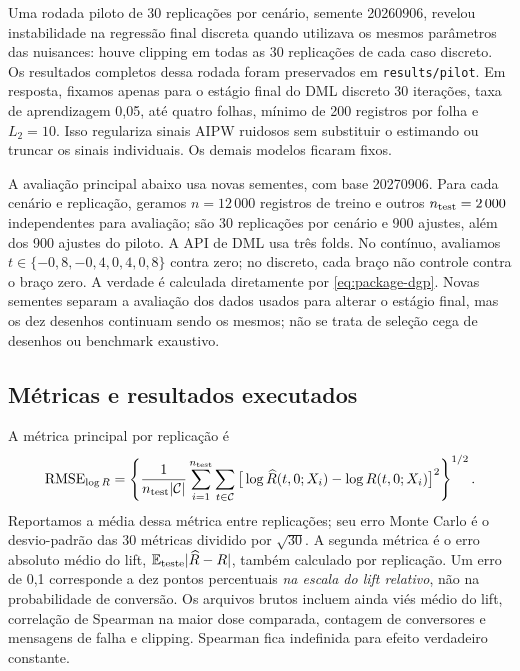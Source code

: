 Uma rodada piloto de 30 replicações por cenário, semente 20260906, revelou instabilidade na regressão final discreta quando utilizava os mesmos parâmetros das nuisances: houve clipping em todas as 30 replicações de cada caso discreto. Os resultados completos dessa rodada foram preservados em \texttt{results/pilot}. Em resposta, fixamos apenas para o estágio final do DML discreto 30 iterações, taxa de aprendizagem 0,05, até quatro folhas, mínimo de 200 registros por folha e $L_2=10$. Isso regulariza sinais AIPW ruidosos sem substituir o estimando ou truncar os sinais individuais. Os demais modelos ficaram fixos.

A avaliação principal abaixo usa novas sementes, com base 20270906. Para cada cenário e replicação, geramos $n=12\,000$ registros de treino e outros $n_{\rm test}=2\,000$ independentes para avaliação; são 30 replicações por cenário e 900 ajustes, além dos 900 ajustes do piloto. A API de DML usa três folds. No contínuo, avaliamos $t\in\{-0{,}8,-0{,}4,0{,}4,0{,}8\}$ contra zero; no discreto, cada braço não controle contra o braço zero. A verdade é calculada diretamente por \eqref{eq:package-dgp}. Novas sementes separam a avaliação dos dados usados para alterar o estágio final, mas os dez desenhos continuam sendo os mesmos; não se trata de seleção cega de desenhos ou benchmark exaustivo.

\subsection{Métricas e resultados executados}
A métrica principal por replicação é
\[
\operatorname{RMSE}_{\log R}
=\left\{\frac{1}{n_{\rm test}|\mathcal C|}
\sum_{i=1}^{n_{\rm test}}\sum_{t\in\mathcal C}
\big[\log\widehat R(t,0;X_i)-\log R(t,0;X_i)\big]^2\right\}^{1/2}.
\]
Reportamos a média dessa métrica entre replicações; seu erro Monte Carlo é o desvio-padrão das 30 métricas dividido por $\sqrt{30}$. A segunda métrica é o erro absoluto médio do lift, $\mathbb E_{\rm teste}|\widehat R-R|$, também calculado por replicação. Um erro de 0,1 corresponde a dez pontos percentuais \emph{na escala do lift relativo}, não na probabilidade de conversão. Os arquivos brutos incluem ainda viés médio do lift, correlação de Spearman na maior dose comparada, contagem de conversores e mensagens de falha e clipping. Spearman fica indefinida para efeito verdadeiro constante.

\begin{table}[htbp]
\centering
\caption{Avaliação principal: média do RMSE de log-ratio e erro Monte Carlo entre parênteses. Trinta replicações, $n=12\,000$ e $n_{\rm test}=2\,000$ por cenário.}
\label{tab:scenarios-log}
\footnotesize
\setlength{\tabcolsep}{4pt}

\end{table}

